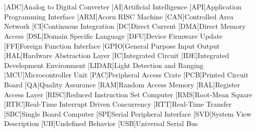 \cleardoublepage
\chapter*{\listofabbrevname}
{}

\begin{acronym}[KolikMista]

	[ADC]{Analog to Digital Converter}
	[AI]{Artificial Intelligence}
	[API]{Application Programming Interface}
	[ARM]{Acorn RISC Machine}
	[CAN]{Controlled Area Network}
	[CI]{Continuous Integration}
	[DC]{Direct Current}
	[DMA]{Direct Memory Access}
	[DSL]{Domain Specific Language}
	[DFU]{Device Firmware Update}
	[FFI]{Foreign Function Interface}
	[GPIO]{General Purpose Input Output}
	[HAL]{Hardware Abstraction Layer}
	[IC]{Integrated Circuit}
	[IDE]{Integrated Development Environment}
	[LIDAR]{Light Detection and Ranging}
	[MCU]{Microcontroller Unit}
	[PAC]{Peripheral Access Crate}
	[PCB]{Printed Circuit Board}
	[QA]{Quality Assurance}
	[RAM]{Random Access Memory}
	[RAL]{Register Access Layer}
	[RISC]{Reduced Instruction Set Computer}
	[RMS]{Root-Mean Square}
	[RTIC]{Real-Time Interrupt Driven Concurrency}
	[RTT]{Real-Time Transfer}
	[SBC]{Single Board Computer}
	[SPI]{Serial Peripheral Interface}
	[SVD]{System View Description}
	[UB]{Undefined Behavior}
	[USB]{Universal Serial Bus}


\end{acronym}
